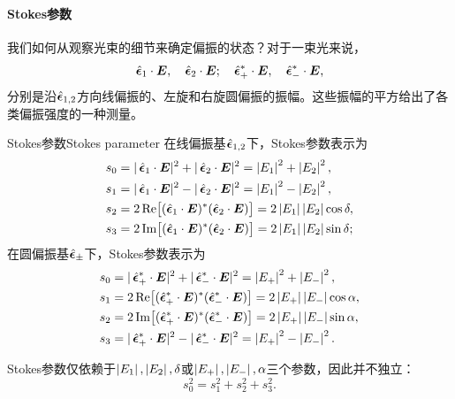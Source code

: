 \paragraph{Stokes参数}

我们如何从观察光束的细节来确定偏振的状态？对于一束光来说，
\[
    \mathop{}\!\hat{\bm{\epsilon}}_1\cdot\bm E,\quad\mathop{}\!\hat{\bm{\epsilon}}_2\cdot\bm E;\quad\mathop{}\!\hat{\bm{\epsilon}}_+^\ast\cdot\bm E,\quad\mathop{}\!\hat{\bm{\epsilon}}_-^\ast\cdot\bm E,
\]
分别是沿$\mathop{}\!\hat{\bm{\epsilon}}_{1,2}$方向线偏振的、左旋和右旋圆偏振的振幅。这些振幅的平方给出了各类偏振强度的一种测量。%

\begin{definition}
    {Stokes参数}{Stokes parameter}
    在线偏振基$\mathop{}\!\hat{\bm{\epsilon}}_{1,2}$下，Stokes参数表示为
    \begin{subequations}
        \begin{align}
            s_0&=|\uvec\epsilon_1\cdot\bm E|^2+|\uvec\epsilon_2\cdot\bm E|^2=\abs{E_1}^2+\abs{E_2}^2,\\
            s_1&=|\uvec\epsilon_1\cdot\bm E|^2-|\uvec\epsilon_2\cdot\bm E|^2=\abs{E_1}^2-\abs{E_2}^2,\\
            s_2&=2\Re\bigfkh{(\uvec\epsilon_1\cdot\bm E)\cj(\uvec\epsilon_2\cdot\bm E)}=2\abs{E_1}\abs{E_2}\cos\delta,\\
            s_3&=2\Im\bigfkh{(\uvec\epsilon_1\cdot\bm E)\cj(\uvec\epsilon_2\cdot\bm E)}=2\abs{E_1}\abs{E_2}\sin\delta;
        \end{align}
    \end{subequations}
    在圆偏振基$\mathop{}\!\hat{\bm{\epsilon}}_\pm$下，Stokes参数表示为
    \begin{subequations}
        \begin{align}
            s_0&=|\uvec\epsilon_+\cj\cdot\bm E|^2+|\uvec\epsilon_-\cj\cdot\bm E|^2=\abs{E_+}^2+\abs{E_-}^2,\\
            s_1&=2\Re\bigfkh{(\uvec\epsilon_+\cj\cdot\bm E)\cj(\uvec\epsilon_-\cj\cdot\bm E)}=2\abs{E_+}\abs{E_-}\cos\alpha,\\
            s_2&=2\Im\bigfkh{(\uvec\epsilon_+\cj\cdot\bm E)\cj(\uvec\epsilon_-\cj\cdot\bm E)}=2\abs{E_+}\abs{E_-}\sin\alpha,\\
            s_3&=|\uvec\epsilon_+\cj\cdot\bm E|^2-|\uvec\epsilon_-\cj\cdot\bm E|^2=\abs{E_+}^2-\abs{E_-}^2.
        \end{align}
    \end{subequations}
\end{definition}
\begin{corollary}
    Stokes参数仅依赖于$\left\lvert E_1\right\rvert,\left\lvert E_2\right\rvert,\delta$或$\left\lvert E_+\right\rvert,\left\lvert E_-\right\rvert,\alpha$三个参数，因此并不独立：
    \[
        s_0^2=s_1^2+s_2^2+s_3^2.
    \]
\end{corollary}


